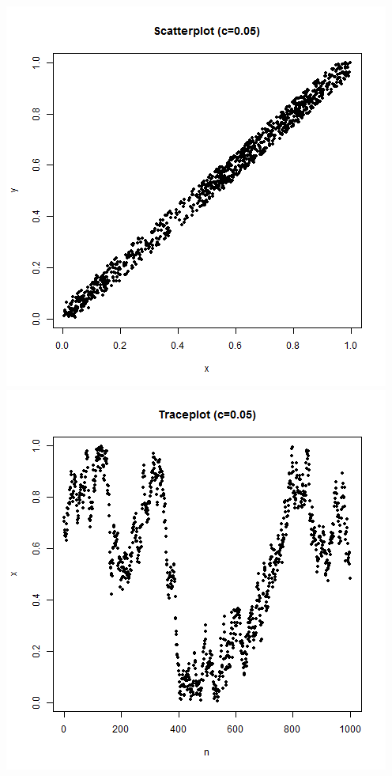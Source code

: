 \documentclass{article}
\begin{document}
\begin{enumerate}
\begin{enumerate}
\includegraphics[scale=0.4]{scat_005.png}
\includegraphics[scale=0.4]{trace_005.png} \\


\end{enumerate}
\end{enumerate}
\end{document}

